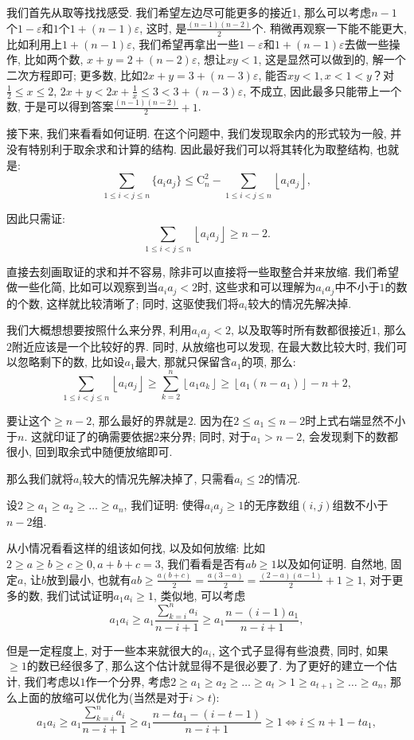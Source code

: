 \documentclass[lang=cn,12pt,thmcnt=section]{elegantbook}
\newcommand{\fl}[1]{\left\lfloor #1\right\rfloor}
\begin{document}
\begin{analysis}
我们首先从取等找找感受. 我们希望左边尽可能更多的接近$1$, 那么可以考虑$n-1$个$1-\varepsilon$和$1$个$1+(n-1)\varepsilon$, 这时, 是$\frac{(n-1)(n-2)}{2}$个. 稍微再观察一下能不能更大, 比如利用上$1+(n-1)\varepsilon$, 我们希望再拿出一些$1-\varepsilon$和$1+(n-1)\varepsilon$去做一些操作, 比如两个数, $x+y=2+(n-2)\varepsilon$, 想让$xy<1$, 这是显然可以做到的, 解一个二次方程即可; 更多数, 比如$2x+y=3+(n-3)\varepsilon$, 能否$xy<1,x<1<y$？对$\frac{1}{2}\le x\le 2$, $2x+y<2x+\frac{1}{x}\le 3<3+(n-3)\varepsilon$, 不成立, 因此最多只能带上一个数, 于是可以得到答案$\frac{(n-1)(n-2)}{2}+1$.

接下来, 我们来看看如何证明. 在这个问题中, 我们发现取余内的形式较为一般, 并没有特别利于取余求和计算的结构. 因此最好我们可以将其转化为取整结构, 也就是: 
\[
\sum_{1\le i<j\le n}\{a_ia_j\}\le \mathrm{C}_{n}^2 -\sum_{1\le i<j \le n}\fl{a_ia_j},
\]

因此只需证: 
\[
\sum_{1\le i<j \le n}\fl{a_ia_j}\ge n-2.
\]

直接去刻画取证的求和并不容易, 除非可以直接将一些取整合并来放缩. 我们希望做一些化简, 比如可以观察到当$a_ia_j<2$时, 这些求和可以理解为$a_ia_j$中不小于$1$的数的个数, 这样就比较清晰了; 同时, 这驱使我们将$a_i$较大的情况先解决掉. 

我们大概想想要按照什么来分界, 利用$a_ia_j<2$, 以及取等时所有数都很接近$1$, 那么$2$附近应该是一个比较好的界. 同时, 从放缩也可以发现, 在最大数比较大时, 我们可以忽略剩下的数, 比如设$a_1$最大, 那就只保留含$a_1$的项, 那么: 
\[
\sum_{1\le i<j \le n}\fl{a_ia_j}\ge \sum_{k=2}^n \fl{a_1a_k}\ge \fl{a_1(n-a_1)}-n+2,
\]

要让这个$\ge n-2$, 那么最好的界就是$2$. 因为在$2\le a_1\le n-2$时上式右端显然不小于$n$. 这就印证了的确需要依据$2$来分界; 同时, 对于$a_1>n-2$, 会发现剩下的数都很小, 回到取余式中随便放缩即可. 

那么我们就将$a_i$较大的情况先解决掉了, 只需看$a_i\le 2$的情况. 

设$2\ge a_1 \ge a_2\ge\dots{}\ge a_n$, 我们证明: 使得$a_ia_j\ge 1$的无序数组$(i,j)$组数不小于$n-2$组.

从小情况看看这样的组该如何找, 以及如何放缩: 比如$2\ge a\ge b\ge c\ge 0,a+b+c=3$, 我们看看是否有$ab\ge 1$以及如何证明. 自然地, 固定$a$, 让$b$放到最小, 也就有$ab\ge \frac{a(b+c)}{2}=\frac{a(3-a)}{2}=\frac{(2-a)(a-1)}{2}+1\ge 1$, 对于更多的数, 我们试试证明$a_1a_i\ge 1$, 类似地, 可以考虑
\[
a_1a_i\ge a_1\frac{\sum_{k=i}^n a_i}{n-i+1}\ge a_1\frac{n-(i-1)a_1}{n-i+1},
\]

但是一定程度上, 对于一些本来就很大的$a_i$, 这个式子显得有些浪费, 同时, 如果$\ge1$的数已经很多了, 那么这个估计就显得不是很必要了. 为了更好的建立一个估计, 我们考虑以$1$作一个分界, 考虑$2\ge a_1 \ge a_2\ge\dots{}\ge a_t>1\ge a_{t+1}\ge  \dots{}\ge a_n$, 那么上面的放缩可以优化为(当然是对于$i>t$): 
\[
a_1a_i\ge a_1\frac{\sum_{k=i}^n a_i}{n-i+1}\ge a_1\frac{n-ta_1-(i-t-1)}{n-i+1}\ge 1 \Leftrightarrow i\le n+1-ta_1,
\]


\end{analysis}
\end{document}
